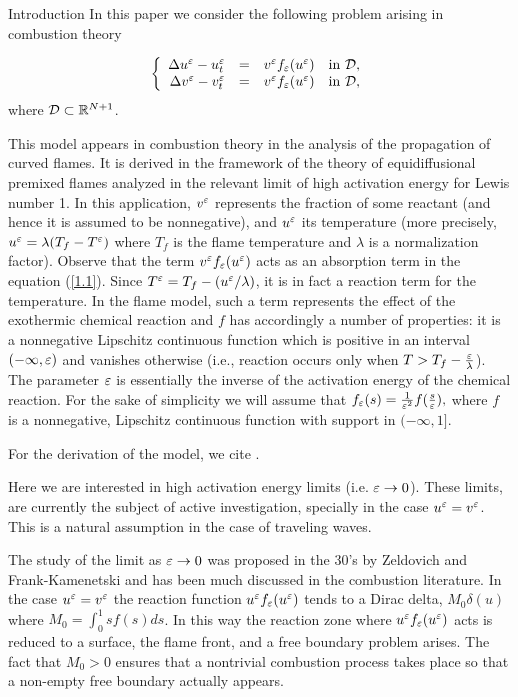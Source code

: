\begin{section}{Introduction}
\setcounter{equation}{0}
In this paper we consider the following problem arising in combustion theory

\begin{equation}
\label{1.1}
\left\{\begin{array}{rcll}
\Delta u^{\varepsilon} - u^{\varepsilon}_{t} & = & v^{\varepsilon} f_{\varepsilon}(u^{\varepsilon}) 
& \mbox{in } {\cal D},\\
\Delta v^{\varepsilon} - v^{\varepsilon}_{t} & = & v^{\varepsilon} f_{\varepsilon}(u^{\varepsilon}) 
& \mbox{in } {\cal D},\\
\end{array}\right.
\end{equation}
where ${\cal D}\subset{\Bbb R}^{N+1}$.

This model appears in combustion theory in the analysis of the propagation 
of curved flames. It is derived in the framework of the theory of 
equidiffusional premixed flames analyzed in the relevant limit of high 
activation energy for Lewis number 1. In this application, $v^{\varepsilon}$ represents the fraction of 
some reactant (and hence it is assumed to be nonnegative), and $u^{\varepsilon}$ its 
temperature (more precisely, $u^{\varepsilon}=\lambda(T_f-T^{\varepsilon})$ where $T_f$ is 
the flame temperature  and $\lambda$ is a 
normalization factor). Observe that the term $v^{\varepsilon}f_{\varepsilon}(u^{\varepsilon})$ acts 
as an absorption term in the equation (\ref{1.1}). 
Since $T^{\varepsilon} = T_f - (u^{\varepsilon}/\lambda)$, it is in fact a reaction term for 
the temperature. In the flame model, such a term represents the effect of the 
exothermic chemical reaction and $f$ has accordingly a number of properties: 
it is a nonnegative Lipschitz continuous function which is positive in an 
interval $(-\infty, \varepsilon)$ and vanishes otherwise (i.e., reaction occurs only 
when $T>T_f-\frac{\varepsilon}\lambda$). The parameter $\varepsilon$ is essentially the inverse of the activation 
energy of the chemical reaction. For the sake of simplicity we will
assume that $f_{\varepsilon}(s)=\frac{1}{\varepsilon^2}f(\frac{s}{\varepsilon}),$ where
$f$ is a nonnegative, Lipschitz continuous function with support in 
$(-\infty,1]$.

For the derivation of the model, we cite \cite{BL}.

Here we are interested in high activation energy limits (i.e. $\varepsilon\to 0$).
These limits, are currently the subject of active investigation, specially
 in the case
$u^{\varepsilon}=v^{\varepsilon}$. This is a natural assumption in the case of traveling waves.

The study of the limit as $\varepsilon\to 0$ was proposed
in the  30's by Zeldovich and Frank-Kamenetski \cite{ZF} and has been much 
discussed in the combustion literature. 
In the case $u^\varepsilon=v^\varepsilon$ the reaction function  $u^\varepsilon f_\varepsilon(u^\varepsilon)$  
tends to a Dirac delta, $M_0\delta(u)$ where $M_0=\int_0^1sf(s)ds$. 
In this way the reaction  
zone where $u^\varepsilon f_\varepsilon(u^\varepsilon)$  acts is reduced to a surface, the flame 
front,  and a free boundary problem arises. The fact that $M_0>0$ 
ensures that a nontrivial combustion process takes place so that a 
non-empty free  boundary actually appears.



\end{section}
